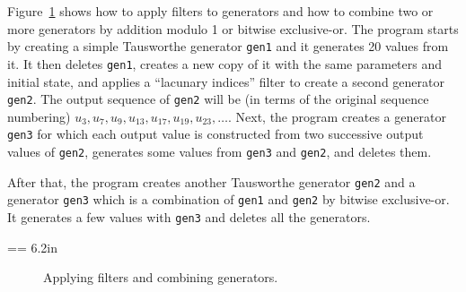 
Figure~\ref{fig:prog-filter} shows how to apply filters to generators
and how to combine two or more generators by addition modulo 1 or bitwise
exclusive-or.
The program starts by creating a simple Tausworthe generator {\tt gen1}
and it generates 20 values from it.
It then deletes {\tt gen1}, creates a new copy of it with the same
parameters and initial state, and applies a ``lacunary indices''
filter to create a second generator {\tt gen2}.
The output sequence of {\tt gen2} will be
(in terms of the original sequence numbering)
$u_3, u_7, u_9, u_{13}, u_{17}, u_{19}, u_{23}, \dots$.
Next, the program creates a generator {\tt gen3} for which each output value
is constructed from two successive output values of {\tt gen2},
generates some values from {\tt gen3} and {\tt gen2}, and deletes them.
%

After that, the program creates another Tausworthe generator {\tt gen2}
and a generator {\tt gen3} which is a combination of {\tt gen1} and
{\tt gen2} by bitwise exclusive-or.  It generates a few values with
{\tt gen3} and deletes all the generators.



=\vbox {\hsize = 6.2in
{\smallc
}
}

\begin{figure} \centering {}
\caption{Applying filters and combining generators.}
\label{fig:prog-filter}
\end{figure}



